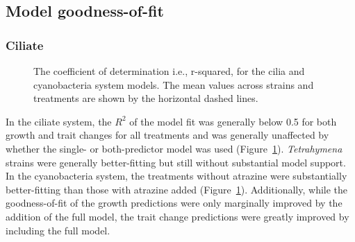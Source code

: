 \documentclass[
  letterpaper,
  DIV=11,
  numbers=noendperiod]{scrartcl}
\begin{document}
\subsection{Model goodness-of-fit}\label{model-goodness-of-fit}

\subsubsection{Ciliate}\label{ciliate-4}

\begin{figure}


\caption{\label{fig-R2}The coefficient of determination i.e., r-squared,
for the cilia and cyanobacteria system models. The mean values across
strains and treatments are shown by the horizontal dashed lines.}

\end{figure}%

In the ciliate system, the \(R^2\) of the model fit was generally below
0.5 for both growth and trait changes for all treatments and was
generally unaffected by whether the single- or both-predictor model was
used (Figure~\ref{fig-R2}). \emph{Tetrahymena} strains were generally
better-fitting but still without substantial model support. In the
cyanobacteria system, the treatments without atrazine were substantially
better-fitting than those with atrazine added (Figure~\ref{fig-R2}).
Additionally, while the goodness-of-fit of the growth predictions were
only marginally improved by the addition of the full model, the trait
change predictions were greatly improved by including the full model.
\end{document}
